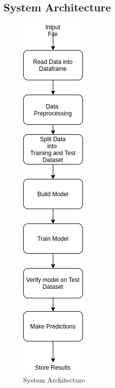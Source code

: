 \documentclass[a4paper, 12pt]{article}
\begin{document}
\newpage
\begin{center}
    \section{System Architecture}
\end{center}
\par
\begin{figure}[h]
    \centering
    \includegraphics[scale=0.71]{DA-SA.jpg}
    \caption{System Architecture}
\end{figure}
\end{document}
